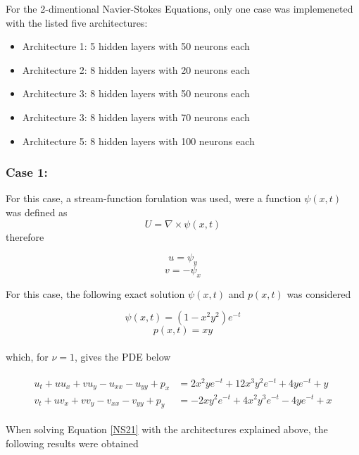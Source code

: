 \documentclass[12pt,letterpaper]{article}
\begin{document}
For the 2-dimentional Navier-Stokes Equations, only one case was implemeneted with the listed five architectures:

\begin{itemize}
  \item Architecture 1: 5 hidden layers with 50 neurons each
  \item Architecture 2: 8 hidden layers with 20 neurons each
  \item Architecture 3: 8 hidden layers with 50 neurons each
  \item Architecture 3: 8 hidden layers with 70 neurons each
  \item Architecture 5: 8 hidden layers with 100 neurons each
\end{itemize}

\subsubsection*{Case 1:}

For this case, a stream-function forulation was used, were a function $\psi(x,t)$ was defined as $$U = \nabla\times\psi(x,t)$$ therefore

$$u = \psi_y$$
$$v = -\psi_x$$

For this case, the following exact solution $\psi(x,t)$ and $p(x,t)$ was considered

$$\psi(x,t) = (1-x^2y^2)e^{-t}$$
$$p(x,t) = xy$$\\

which, for $\nu=1$, gives the PDE below

\begin{align}
  \label{NS21}
  \begin{split}
    u_t + u u_x + vu_y - u_{xx} - u_{yy} + p_x & = 2x^2ye^{-t} + 12 x^3y^2 e^{-t} + 4ye^{-t} + y \\
    v_t + u v_x + v v_y - v_{xx} - v_{yy} + p_y &= - 2xy^2e^{-t} + 4 x^2y^3 e^{-t} - 4ye^{-t} + x
  \end{split}
\end{align}
 

When solving Equation \ref{NS21} with the architectures explained above, the following results were obtained
\end{document}
